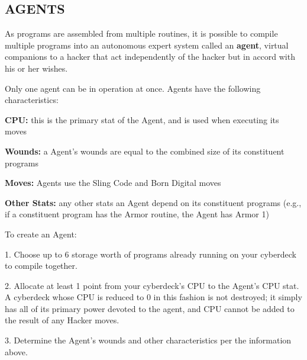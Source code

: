 \documentclass[oneside,10pt]{article}
\begin{document}
\begin{multicols}{2}
\subsection{AGENTS}
As programs are assembled from multiple routines, it is possible to compile multiple programs into an autonomous expert system called an \textbf{agent}, virtual companions to a hacker
that act independently of the hacker but in accord with his or
her wishes.

Only one agent can be in operation at once. Agents have the
following characteristics:
\begin{adjustwidth*}{.5cm}{.5cm}

\textbf{CPU:} this is the primary stat of the Agent, and is used
when executing its moves

\textbf{Wounds:} a Agent’s wounds are equal to the combined
size of its constituent programs

\textbf{Moves:} Agents use the Sling Code and Born Digital moves

\textbf{Other Stats:} any other stats an Agent depend on its constituent programs (e.g., if a constituent program has the
Armor routine, the Agent has Armor 1)
\end{adjustwidth*}
To create an Agent:
\begin{adjustwidth*}{.5cm}{.5cm}

1.	Choose up to 6 storage worth of programs already running on your cyberdeck to compile together.

2.	Allocate at least 1 point from your cyberdeck’s CPU to
the Agent’s CPU stat. A cyberdeck whose CPU is reduced to 0 in this fashion is not destroyed; it simply has
all of its primary power devoted to the agent, and CPU
cannot be added to the result of any Hacker moves.

3.	Determine the Agent’s wounds and other characteristics per the information above.
\end{adjustwidth*}
\end{multicols}

\end{document}
